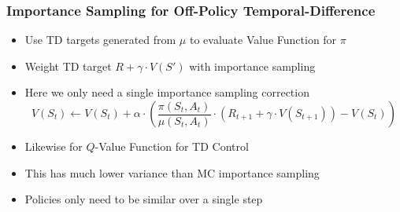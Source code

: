 \documentclass[handout]{beamer}
\begin{document}
\begin{frame}
\frametitle{Importance Sampling for Off-Policy Temporal-Difference}
\pause
\begin{itemize}[<+->]
\item  Use TD targets generated from $\mu$ to evaluate Value Function for $\pi$
\item Weight TD target $R + \gamma \cdot V(S')$ with importance sampling
\item Here we only need a single importance sampling correction
$$V(S_t) \leftarrow V(S_t) + \alpha \cdot ( \frac {\pi(S_t, A_t)} {\mu(S_t, A_t)} \cdot (R_{t+1} + \gamma \cdot V(S_{t+1})) - V(S_t))$$
\item Likewise for $Q$-Value Function for TD Control
\item This has much lower variance than MC importance sampling
\item Policies only need to be similar over a single step
\end{itemize}
\end{frame}
\end{document}
